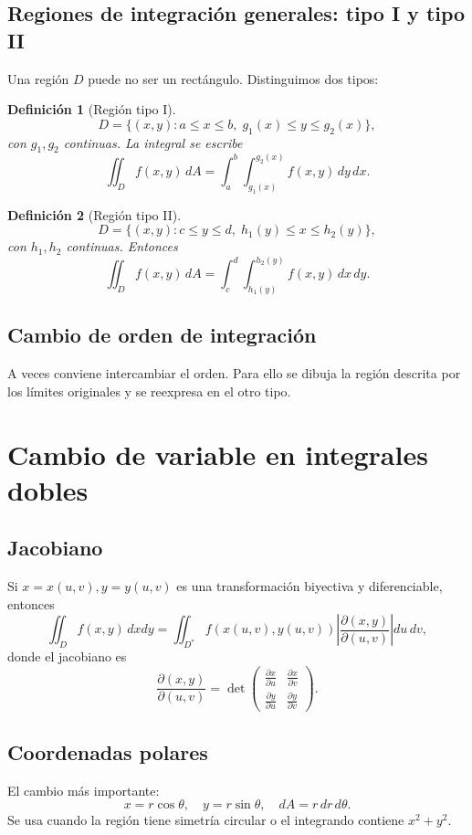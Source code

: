 \documentclass[12pt,spanish]{article}
\newtheorem{definicion}{Definición}[section]
\begin{document}
\subsection{Regiones de integración generales: tipo I y tipo II}

Una región $D$ puede no ser un rectángulo. Distinguimos dos tipos:

\begin{definicion}[Región tipo I]
\[
D = \{(x,y): a\le x\le b,\; g_1(x)\le y\le g_2(x)\},
\]
con $g_1,g_2$ continuas. La integral se escribe
\[
\iint_D f(x,y)\,dA = \int_a^b \int_{g_1(x)}^{g_2(x)} f(x,y)\,dy\,dx.
\]
\end{definicion}

\begin{definicion}[Región tipo II]
\[
D = \{(x,y): c\le y\le d,\; h_1(y)\le x\le h_2(y)\},
\]
con $h_1,h_2$ continuas. Entonces
\[
\iint_D f(x,y)\,dA = \int_c^d \int_{h_1(y)}^{h_2(y)} f(x,y)\,dx\,dy.
\]
\end{definicion}

\subsection{Cambio de orden de integración}
A veces conviene intercambiar el orden. Para ello se dibuja la región descrita por los límites originales y se reexpresa en el otro tipo.

\section{Cambio de variable en integrales dobles}

\subsection{Jacobiano}
Si $x=x(u,v), y=y(u,v)$ es una transformación biyectiva y diferenciable, entonces
\[
\iint_D f(x,y)\,dxdy = \iint_{D^*} f(x(u,v),y(u,v)) \left| \frac{\partial(x,y)}{\partial(u,v)} \right| du\,dv,
\]
donde el jacobiano es
\[
\frac{\partial(x,y)}{\partial(u,v)} = \det\begin{pmatrix}
\frac{\partial x}{\partial u} & \frac{\partial x}{\partial v} \\
\frac{\partial y}{\partial u} & \frac{\partial y}{\partial v}
\end{pmatrix}.
\]

\subsection{Coordenadas polares}
El cambio más importante:
\[
x = r\cos\theta,\quad y = r\sin\theta,\quad dA = r\,dr\,d\theta.
\]
Se usa cuando la región tiene simetría circular o el integrando contiene $x^2+y^2$.
\end{document}
